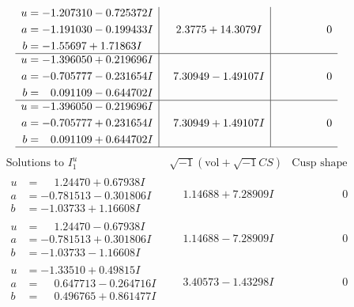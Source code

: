 \documentclass[1p]{elsarticle_modified}
\theoremstyle{definition}
\newcommand{\I}{\sqrt{-1}}
\begin{document}
$$\begin{array}{c|c|c}
\begin{aligned}
u &= -1.207310 - 0.725372 I \\
a &= -1.191030 - 0.199433 I \\
b &= -1.55697 + 1.71863 I\end{aligned}
 & \phantom{-}2.3775 + 14.3079 I & \phantom{-0.000000 } 0 \\ \hline\begin{aligned}
u &= -1.396050 + 0.219696 I \\
a &= -0.705777 - 0.231654 I \\
b &= \phantom{-}0.091109 - 0.644702 I\end{aligned}
 & \phantom{-}7.30949 - 1.49107 I & \phantom{-0.000000 } 0 \\ \hline\begin{aligned}
u &= -1.396050 - 0.219696 I \\
a &= -0.705777 + 0.231654 I \\
b &= \phantom{-}0.091109 + 0.644702 I\end{aligned}
 & \phantom{-}7.30949 + 1.49107 I & \phantom{-0.000000 } 0\\
 \hline 
 \end{array}$$\newpage$$\begin{array}{c|c|c}  
\text{Solutions to }I^u_{1}& \I (\text{vol} + \sqrt{-1}CS) & \text{Cusp shape}\\
 \hline 
\begin{aligned}
u &= \phantom{-}1.24470 + 0.67938 I \\
a &= -0.781513 - 0.301806 I \\
b &= -1.03733 + 1.16608 I\end{aligned}
 & \phantom{-}1.14688 + 7.28909 I & \phantom{-0.000000 } 0 \\ \hline\begin{aligned}
u &= \phantom{-}1.24470 - 0.67938 I \\
a &= -0.781513 + 0.301806 I \\
b &= -1.03733 - 1.16608 I\end{aligned}
 & \phantom{-}1.14688 - 7.28909 I & \phantom{-0.000000 } 0 \\ \hline\begin{aligned}
u &= -1.33510 + 0.49815 I \\
a &= \phantom{-}0.647713 - 0.264716 I \\
b &= \phantom{-}0.496765 + 0.861477 I\end{aligned}
 & \phantom{-}3.40573 - 1.43298 I & \phantom{-0.000000 } 0 \\ \hline\begin{aligned}

\end{aligned}
\end{array}$$
\end{document}
